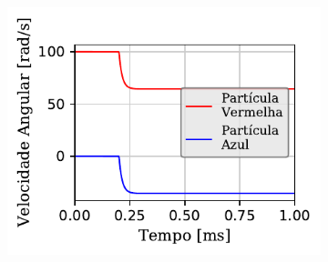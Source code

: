 \begin{figure}[htb!]
{		\begin{subfigure}[t]{\smallresultsfigwidth}
			\centering
			\includegraphics[scale=1]{images/colliding_spheres/dissipative_rotation/AngularVelocity-Z_small_alternative.pdf}
			\caption{}
			\label{subfig:colliding_spheres:dissipative_rotation:z_angular_velocity}
		\end{subfigure}
	}
	\label{fig:colliding_spheres:dissipative_rotation:kinematic_results}
	\sourceMe
\end{figure}

